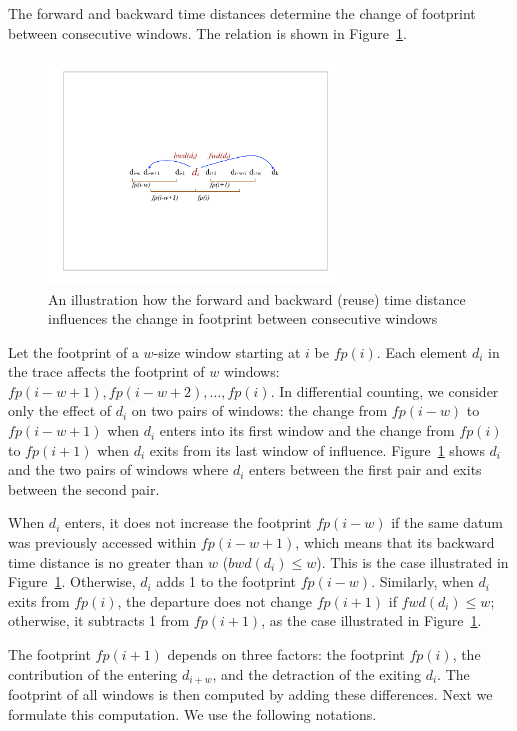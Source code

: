 
The forward and backward time distances determine the change 
of footprint between consecutive windows.  The relation is shown
in Figure~\ref{fig:illus-aver-fp}.  

\begin{figure}[h!]
\centering
\includegraphics[width=7.8cm]{figures/fp/di_fig}
\caption{An illustration how the forward and backward (reuse) time
  distance influences the change in footprint between consecutive
  windows}
\label{fig:illus-aver-fp}
\end{figure}

Let the footprint of a $w$-size window starting at $i$ be $fp(i)$.
Each element $d_i$ in the trace affects the footprint of $w$ windows:
$fp(i-w+1), fp(i-w+2), \dots, fp(i)$.  In differential counting, we
consider only the effect of $d_i$ on two pairs of windows: the change
from $fp(i-w)$ to $fp(i-w+1)$ when $d_i$ enters into its first window
and the change from $fp(i)$ to $fp(i+1)$ when $d_i$ exits from its
last window of influence.   Figure~\ref{fig:illus-aver-fp} shows $d_i$ and 
the two pairs of windows where $d_i$ enters between the first pair and
exits between the second pair.

When $d_i$ enters, it does not increase the footprint $fp(i-w)$ if the
same datum was previously accessed within $fp(i-w+1)$, which means
that its backward time distance is no greater than $w$ ($bwd(d_i) \le
w$).  This is the case illustrated in Figure~\ref{fig:illus-aver-fp}.  Otherwise,
$d_i$ adds 1 to the footprint $fp(i-w)$.  Similarly, when $d_i$ exits
from $fp(i)$, the departure does not change $fp(i+1)$ if $fwd(d_i) \le
w$; otherwise, it subtracts 1 from $fp(i+1)$, as the case
illustrated in Figure~\ref{fig:illus-aver-fp}.

The footprint $fp(i+1)$ depends on three factors: the footprint
$fp(i)$, the contribution of the entering $d_{i+w}$,
and the detraction of the exiting $d_i$.  The footprint of all windows
is then computed by adding these differences.  Next we formulate
this computation.  We use the following notations.

